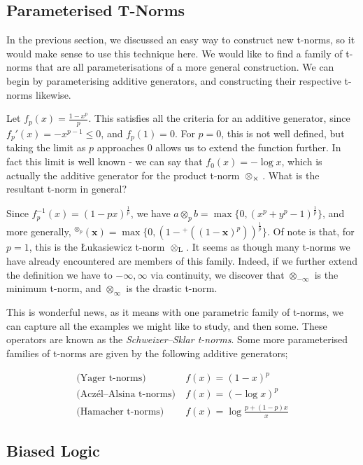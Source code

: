 \documentclass[conference]{report}
\begin{document}
\subsection{Parameterised T-Norms}

In the previous section, we discussed an easy way to construct new t-norms, so it would make sense to use this technique here. We would like to find a family of t-norms that are all parameterisations of a more general construction. We can begin by parameterising additive generators, and constructing their respective t-norms likewise.

Let $f_p(x) = \frac{1 - x^p}{p}$. This satisfies all the criteria for an additive generator, since $f_p'(x) = -x^{p-1} \leq 0$, and $f_p(1) = 0$. For $p=0$, this is not well defined, but taking the limit as $p$ approaches 0 allows us to extend the function further. In fact this limit is well known - we can say that $f_0(x)=-\log x$, which is actually the additive generator for the product t-norm ${\mspace{4mu}\otimes_\times\mspace{4mu}}$. What is the resultant t-norm in general?

Since $f^{-1}_p(x) = (1-px)^\frac{1}{p}$, we have $a \otimes_p b = \max\{0, (x^p + y^p - 1)^\frac{1}{p}\}$, and more generally, ${^{\otimes_p}}(\mathbf{x}) = \max\{0, (1 - {^+}((1 - \mathbf{x})^p))^\frac{1}{p}\}$. Of note is that, for $p=1$, this is the Łukasiewicz t-norm ${\mspace{4mu}\otimes_\text{L}\mspace{4mu}}$. It seems as though many t-norms we have already encountered are members of this family. Indeed, if we further extend the definition we have to $-\infty, \infty$ via continuity, we discover that $\otimes_{-\infty}$ is the minimum t-norm, and $\otimes_\infty$ is the drastic t-norm.

This is wonderful news, as it means with one parametric family of t-norms, we can capture all the examples we might like to study, and then some. These operators are known as the \textit{Schweizer–Sklar t-norms}. Some more parameterised families of t-norms are given by the following additive generators;

$$
\begin{aligned}
\text{(Yager t-norms)}&\ f(x) = (1-x)^p \\
\text{(Aczél–Alsina t-norms)}&\ f(x) = (- \log x)^p \\
\text{(Hamacher t-norms)}&\ f(x) = \log\frac{p+(1-p)x}{x}
\end{aligned}
$$

\subsection{Biased Logic}
\end{document}
